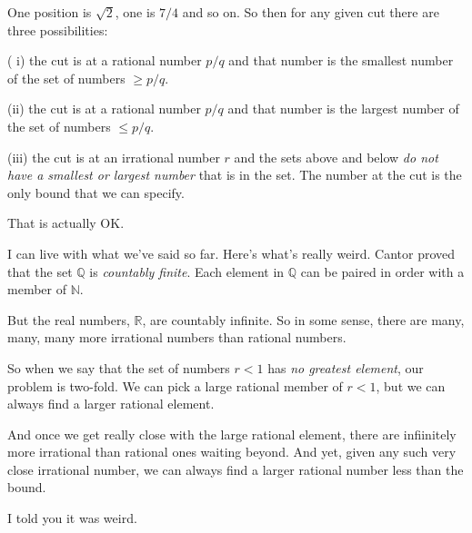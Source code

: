 \documentclass[11pt, oneside]{article}
\begin{document}
One position is $\sqrt{2}$, one is $7/4$ and so on. So then for any given cut there are three possibilities:  

( i) the cut is at a rational number $p/q$ and that number is the smallest number of the set of numbers $\ge p/q$.

(ii) the cut is at a rational number $p/q$ and that number is the largest number of the set of numbers $\le p/q$.

(iii) the cut is at an irrational number $r$ and the sets above and below \emph{do not have a smallest or largest number} that is in the set.  The number at the cut is the only bound that we can specify.

That is actually OK.

I can live with what we've said so far.  Here's what's really weird.  Cantor proved that the set $\mathbb{Q}$ is \emph{countably finite}.  Each element in $\mathbb{Q}$ can be paired in order with a member of $\mathbb{N}$.

But the real numbers, $\mathbb{R}$, are countably infinite.  So in some sense, there are many, many, many more irrational numbers than rational numbers.

So when we say that the set of numbers $r < 1$ has \emph{no greatest element}, our problem is two-fold.  We can pick a large rational member of $r < 1$, but we can always find a larger rational element.  

And once we get really close with the large rational element, there are infiinitely more irrational than rational ones waiting beyond.  And yet, given any such very close irrational number, we can always find a larger rational number less than the bound.

I told you it was weird.
\end{document}
